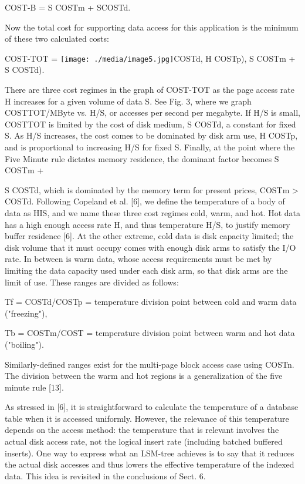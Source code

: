\documentclass[a4paper,11pt,notitlepage,twoside,openright]{article}
\begin{document}
COST-B = S COSTm + SCOSTd.

Now the total cost for supporting data access for this application is
the minimum of these two calculated costs:

COST-TOT =
\texttt{[image: ./media/image5.jpg]}COSTd,
H COSTp), S COSTm + S COSTd).

There are three cost regimes in the graph of COST-TOT as the page access
rate H increases for a given volume of data S. See Fig. 3, where we
graph COSTTOT/MByte vs. H/S, or accesses per second per megabyte. If H/S
is small, COSTTOT is limited by the cost of disk medium, S COSTd, a
constant for fixed S. As H/S increases, the cost comes to be dominated
by disk arm use, H COSTp, and is proportional to increasing H/S for
fixed S. Finally, at the point where the Five Minute rule dictates
memory residence, the dominant factor becomes S COSTm +

S COSTd, which is dominated by the memory term for present prices, COSTm
\textgreater{} COSTd. Following Copeland et al. {[}6{]}, we define the
temperature of a body of data as HIS, and we name these three cost
regimes cold, warm, and hot. Hot data has a high enough access rate H,
and thus temperature H/S, to justify memory buffer residence {[}6{]}. At
the other extreme, cold data is disk capacity limited; the disk volume
that it must occupy comes with enough disk arms to satisfy the I/O rate.
In between is warm data, whose access requirements must be met by
limiting the data capacity used under each disk arm, so that disk arms
are the limit of use. These ranges are divided as follows:

Tf = COSTd/COSTp = temperature division point between cold and warm data
("freezing"),

Tb = COSTm/COST = temperature division point between warm and hot data
("boiling").

Similarly-defined ranges exist for the multi-page block access case
using COSTn. The division between the warm and hot regions is a
generalization of the five minute rule {[}13{]}.

As stressed in {[}6{]}, it is straightforward to calculate the
temperature of a database table when it is accessed uniformly. However,
the relevance of this temperature depends on the access method: the
temperature that is relevant involves the actual disk access rate, not
the logical insert rate (including batched buffered inserts). One way to
express what an LSM-tree achieves is to say that it reduces the actual
disk accesses and thus lowers the effective temperature of the indexed
data. This idea is revisited in the conclusions of Sect. 6.
\end{document}
